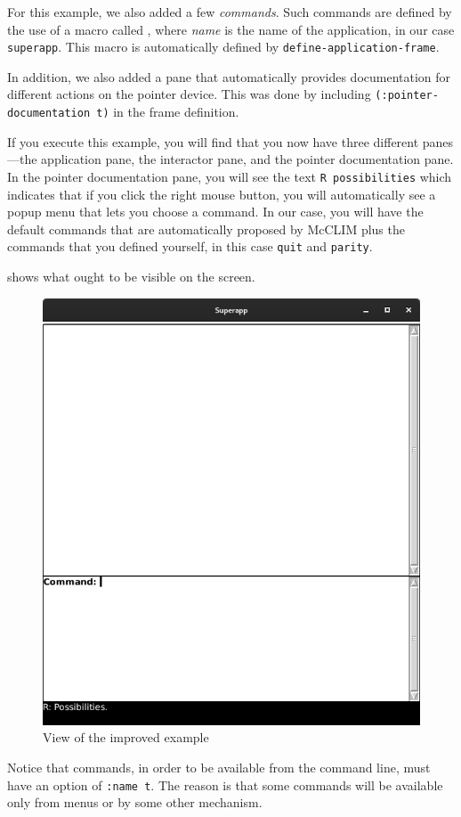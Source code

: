 For this example, we also added a few \emph{commands}.  Such
commands are defined by the use of a macro called
, where
\textit{name} is the name of the application, in our case
\texttt{superapp}. This macro is automatically defined by
\texttt{define-application-frame}.

In addition, we also added a pane that automatically provides documentation for
different actions on the pointer device. This was done by
including \texttt{(:pointer-documentation t)} in the frame definition.

If you execute this example, you will find that you now have three
different panes—the application pane, the interactor pane, and the
pointer documentation pane.  In the pointer documentation pane, you
will see the text \texttt{R possibilities} which indicates that if you
click the right mouse button, you will automatically see a popup menu
that lets you choose a command.  In our case, you will have the
default commands that are automatically proposed by McCLIM plus the
commands that you defined yourself, in this case \texttt{quit} and
\texttt{parity}.

 shows what ought to be visible on the screen.

\begin{figure}
\begin{center}
\includegraphics[width=.6\linewidth]{ex2-screenshot.png}
\end{center}
\caption{\label{ex2} View of the improved example}
\end{figure}

Notice that commands, in order to be available from the command line,
must have an option of \texttt{:name t}.  The reason is that some
commands will be available only from menus or by some other mechanism.


